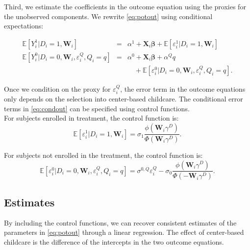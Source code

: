 \begin{appendices}
\noindent Third, we estimate the coefficients in the outcome equation using the proxies for the unobserved components. We rewrite \eqref{eq:potout} using conditional expectations:

\begin{eqnarray}
\mathbb{E}\left[Y_i^1|D_i=1,\mathbf{W}_i\right]                         &=& \alpha^1+\mathbf{X}_i\mathbf{\beta}              +\mathbb{E}\left[\varepsilon_i^1|D_i=1,\mathbf{W}_i      \right] \nonumber \\
\mathbb{E}\left[Y_i^0|D_i=0,\mathbf{W}_i,\varepsilon^{Q}_i,Q_i=q\right] &=& \alpha^0+\mathbf{X}_i\mathbf{\beta} +\alpha^Q q \label{eq:condout} \\ \nonumber && \quad + \mathbb{E}\left[\varepsilon_i^0|D_i=0,\mathbf{W}_i,\varepsilon^{Q}_i,Q_i=q\right].
\end{eqnarray}

\noindent Once we condition on the proxy for $\varepsilon^{Q}_i$, the error term in the outcome equations only depends on the selection into center-based childcare. The conditional error terms in \eqref{eq:condout} can be specified using control functions.\\ 

\noindent For subjects enrolled in treatment, the control function is: 
\begin{equation}
\mathbb{E} \left[\varepsilon_i^1|D_i=1,\mathbf{W}_i \right]=\sigma_1\frac{\phi \left( \mathbf{W}_i \gamma^D \right) }{ \Phi \left( \mathbf{W}_i \gamma^D \right) }. \label{eq:contam}
\end{equation}

\noindent For subjects not enrolled in the treatment, the control function is:
\begin{equation}
\mathbb{E} \left[\varepsilon_i^0|D_i=0,\mathbf{W}_i,\varepsilon^{Q}_i,Q_i=q\right]= \sigma^{0,Q}\varepsilon^{Q}_i - \sigma_0 \frac{\phi\left(\mathbf{W}_i\gamma^D\right)}{\Phi\left( - \mathbf{W}_{i} \gamma^D \right) }. \label{eq:home}
\end{equation}

\subsection{Estimates}

\noindent By including the control functions, we can recover consistent estimates of the parameters in \eqref{eq:potout} through a linear regression. The effect of center-based childcare is the difference of the intercepts in the two outcome equations.\\


\end{appendices}
